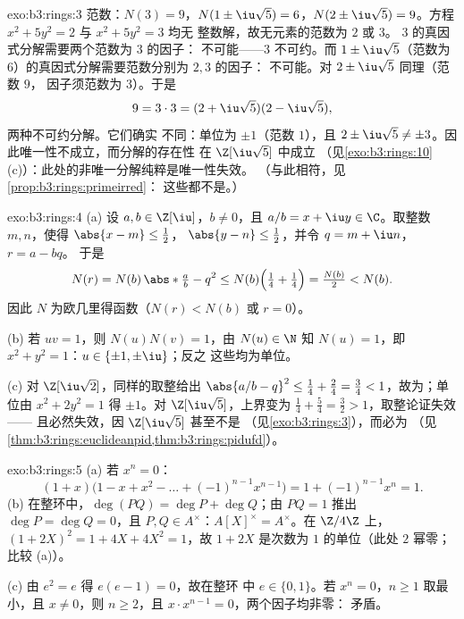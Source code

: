\begin{solution}{exo:b3:rings:3}
范数：$N(3) = 9$，$N(1 \pm \iu\sqrt5) = 6$，$N(2 \pm \iu\sqrt5) =
9$。方程 $x^2 + 5y^2 = 2$ 与 $x^2 + 5y^2 = 3$ 均无
整数解，故无元素的范数为 $2$ 或 $3$。
$3$ 的真因式分解需要两个范数为 $3$ 的因子：
不可能——$3$ 不可约。而 $1
\pm \iu\sqrt5$（范数为 $6$）的真因式分解需要范数分别为 $2, 3$ 的因子：
不可能。对 $2 \pm \iu\sqrt5$ 同理（范数 $9$，
因子须范数为 $3$）。于是
\[
9 = 3 \cdot 3 = (2 + \iu\sqrt5)(2 - \iu\sqrt5),
\]
两种不可约分解。它们确实
不同：单位为 $\pm 1$（范数 $1$），且 $2 \pm \iu\sqrt5
\neq \pm 3$。因此唯一性不成立，而分解的存在性
在 $\Z[\iu\sqrt5]$ 中成立
（见\cref{exo:b3:rings:10}(c)）：此处的非唯一分解纯粹是唯一性失效。
（与此相符，见\cref{prop:b3:rings:primeirred}：
这些都不是。）
\end{solution}

\begin{solution}{exo:b3:rings:4}
(a) 设 $a, b \in \Z[\iu]$，$b \neq 0$，且 $a/b = x + \iu y \in
\C$。取整数 $m, n$，使得 $\abs{x - m} \leq \frac12$，
$\abs{y - n} \leq \frac12$，并令 $q = m + \iu n$，$r = a - bq$。
于是
\[
N(r) = N(b)\,\abs*{\tfrac ab - q}^2
\leq N(b)\Bigl(\tfrac14 + \tfrac14\Bigr) = \tfrac{N(b)}2 < N(b).
\]
因此 $N$ 为欧几里得函数（$N(r) < N(b)$ 或 $r = 0$）。

(b) 若 $uv = 1$，则 $N(u)N(v) = 1$，由 $N(u) \in \N$ 知 $N(u) =
1$，即 $x^2 + y^2 = 1$：$u \in \{\pm 1, \pm\iu\}$；反之
这些均为单位。

(c) 对 $\Z[\iu\sqrt2]$，同样的取整给出 $\abs{a/b - q}^2
\leq \frac14 + \frac{2}4 = \frac34 < 1$，故为；单位由 $x^2 +
2y^2 = 1$ 得 $\pm 1$。对 $\Z[\iu\sqrt5]$，上界变为
$\frac14 + \frac54 = \frac32 > 1$，取整论证失效——
且必然失效，因 $\Z[\iu\sqrt5]$ 甚至不是
（见\cref{exo:b3:rings:3}），而必为
（见\cref{thm:b3:rings:euclideanpid,thm:b3:rings:pidufd}）。
\end{solution}

\begin{solution}{exo:b3:rings:5}
(a) 若 $x^n = 0$：
\[
(1 + x)\bigl(1 - x + x^2 - \dots + (-1)^{n-1}x^{n-1}\bigr)
= 1 + (-1)^{n-1}x^n = 1 .
\]
(b) 在整环中，$\deg(PQ) = \deg P + \deg Q$；由 $PQ = 1$ 推出
$\deg P = \deg Q = 0$，且 $P, Q \in A^\times$：$A[X]^\times =
A^\times$。在 $\Z/4\Z$ 上，$(1 + 2X)^2 = 1 + 4X + 4X^2 = 1$，故 $1
+ 2X$ 是次数为 $1$ 的单位（此处 $2$ 幂零；比较
(a)）。

(c) 由 $e^2 = e$ 得 $e(e - 1) = 0$，故在整环
中 $e \in \{0, 1\}$。若 $x^n = 0$，$n \geq 1$ 取最小，且 $x \ne 0$，则
$n \geq 2$，且 $x \cdot x^{n-1} = 0$，两个因子均非零：
矛盾。
\end{solution}

